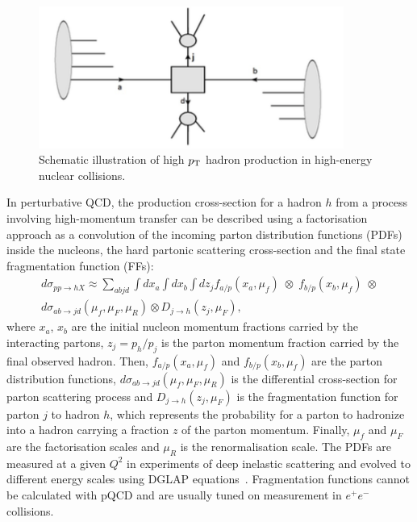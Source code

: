 \begin{figure}[!ht]
  \centering
  \includegraphics[width=10cm]{FigCap1/Scattering.png}
  \caption{Schematic illustration of high $p_{\rm T}$ hadron production in high-energy nuclear collisions. }
  \label{fig:Scattering}
\end{figure}

In perturbative QCD, the production cross-section for a hadron $h$ 
from a process involving high-momentum transfer can be described 
using a factorisation approach as a convolution of the incoming parton distribution functions (PDFs) 
inside the nucleons, the hard partonic scattering cross-section and 
the final state fragmentation function (FFs):
\begin{equation}
\label{eq:QCDhardProduction}
\begin{split}
d\sigma_{pp\rightarrow hX} \approx \sum_{abjd}\int dx_a \int dx_b \int dz_j f_{a/p} (x_a, \mu_f) \; \otimes \;f_{b/p} (x_b, \mu_f) \;\otimes \\
d\sigma_{ab \rightarrow jd} (\mu_f,\mu_F,\mu_R) \otimes D_{j\rightarrow h} (z_j,\mu_F), 
\end{split}
\end{equation}
where $x_a$, $x_b$ are the initial nucleon momentum fractions carried by the
 interacting partons, $z_j = p_h/p_j$ is the parton momentum 
 fraction carried by the final observed hadron. Then, $f_{a/p} (x_a, \mu_f)$
  and $f_{b/p} (x_b, \mu_f) $ are the parton distribution functions, 
  $d\sigma_{ab \rightarrow jd} (\mu_f,\mu_F,\mu_R) $ is the differential 
  cross-section for parton scattering process and $D_{j\rightarrow h} (z_j,\mu_F)$
   is the fragmentation function for parton $j$ to hadron $h$, which represents
    the probability for a parton to hadronize into a hadron carrying a fraction $z$ 
    of the parton momentum. Finally, $\mu_f$ and $\mu_F$ are the factorisation 
    scales and $\mu_R$ is the renormalisation scale. The PDFs are measured 
    at a given $Q^2$ in experiments of deep inelastic scattering and evolved
     to different energy scales using DGLAP equations~\cite{Altarelli:1977zs}.
      Fragmentation functions cannot be calculated with pQCD and are usually 
      tuned on measurement in $e^+e^-$ collisions.\\

